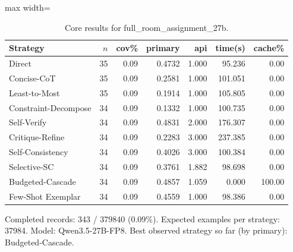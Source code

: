 \documentclass[10pt,twocolumn]{article}
\begin{document}
\begin{table}[t]
\centering
\caption{Core results for full\_room\_assignment\_27b.}
\label{tab:full_room_assignment_27b_core}
\begin{adjustbox}{max width=\textwidth}
\begin{tabular}{lrrrrrr}
\toprule
Strategy & $n$ & cov\% & primary & api & time(s) & cache\% \\
\midrule
Direct & 35 & 0.09 & 0.4732 & 1.000 & 95.236 & 0.00 \\
Concise-CoT & 35 & 0.09 & 0.2581 & 1.000 & 101.051 & 0.00 \\
Least-to-Most & 35 & 0.09 & 0.1914 & 1.000 & 105.805 & 0.00 \\
Constraint-Decompose & 34 & 0.09 & 0.1332 & 1.000 & 100.735 & 0.00 \\
Self-Verify & 34 & 0.09 & 0.4831 & 2.000 & 176.307 & 0.00 \\
Critique-Refine & 34 & 0.09 & 0.2283 & 3.000 & 237.385 & 0.00 \\
Self-Consistency & 34 & 0.09 & 0.4026 & 3.000 & 100.384 & 0.00 \\
Selective-SC & 34 & 0.09 & 0.3761 & 1.882 & 98.698 & 0.00 \\
Budgeted-Cascade & 34 & 0.09 & 0.4857 & 1.059 & 0.000 & 100.00 \\
Few-Shot Exemplar & 34 & 0.09 & 0.4559 & 1.000 & 98.386 & 0.00 \\
\bottomrule
\end{tabular}
\end{adjustbox}
\vspace{2pt}\parbox{0.98\textwidth}{\footnotesize Completed records: 343 / 379840 (0.09\%). Expected examples per strategy: 37984. Model: Qwen3.5-27B-FP8. Best observed strategy so far (by primary): Budgeted-Cascade.}
\end{table}
\end{document}
